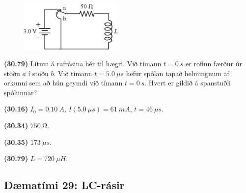 \ifdefined \wholebook \else\documentclass[oneside]{book}\usepackage{EdlBook}\graphicspath{{figures/}}
\begin{document}
\begin{enumerate}[label = \textbf{(\alph*)}]

\vspace{0.3cm}

\begin{minipage}{\linewidth}
\begin{figure}
\vspace{-0.5cm}
\includegraphics[width = 2in]{figures/rk3079.pdf}
\end{figure}

\item[\textbf{(30.79)}] Lítum á rafrásina hér til hægri. Við tímann $t = \SI{0}{s}$ er rofinn færður úr stöðu $a$ í stöðu $b$. Við tímann $t = \SI{5.0}{\mu s}$ hefur spólan tapað helmingnum af orkunni sem að hún geymdi við tímann $t = \SI{0}{s}$. Hvert er gildið á spanstuðli spólunnar?

\end{minipage}


\end{enumerate}

\vspace{0.75cm}

\begin{tcolorbox}
\begin{enumerate*}[label = ]
  \item \textbf{(30.16)} $I_0 = \SI{0.10}{A}$, $I(\SI{5.0}{\mu s}) = \SI{61}{mA}$, $t = \SI{46}{\mu s}$.
  \item \textbf{(30.34)} $\SI{750}{\ohm}$.
  \item \textbf{(30.35)} $\SI{173}{\mu s}$. \\
  \item \textbf{(30.79)} $L = \SI{720}{\mu H}$.
\end{enumerate*}
\end{tcolorbox}

\newpage

\subsection*{Dæmatími 29: LC-rásir}
\end{document}
